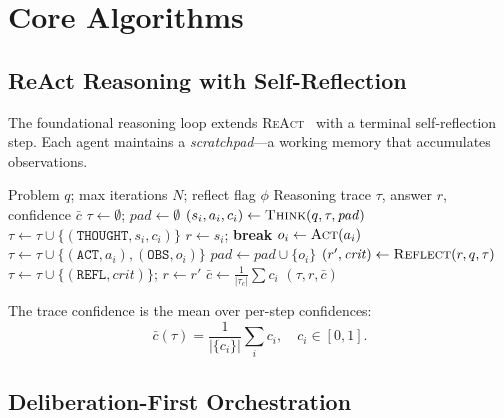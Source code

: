 \documentclass{article}
\theoremstyle{plain}
\theoremstyle{definition}
\newcommand{\react}{\textsc{ReAct}}
\begin{document}
\section{Core Algorithms}\label{sec:algorithms}

\subsection{ReAct Reasoning with Self-Reflection}\label{sec:react_algo}

The foundational reasoning loop extends \react{}~\citep{yao2023react} with a
terminal self-reflection step.  Each agent maintains a
\emph{scratchpad}---a working memory that accumulates observations.

\begin{algorithm}[ht!]
\caption{ReAct Reasoning with Self-Reflection}
\label{alg:react}
\begin{algorithmic}
\REQUIRE Problem $q$; max iterations $N$; reflect flag $\phi$
\ENSURE Reasoning trace $\tau$, answer $r$, confidence $\bar{c}$
\STATE $\tau \leftarrow \emptyset$; $\mathit{pad} \leftarrow \emptyset$
  \STATE $(s_i, a_i, c_i) \leftarrow \textsc{Think}(q, \tau, \mathit{pad})$
  \STATE $\tau \leftarrow \tau \cup \{(\texttt{THOUGHT}, s_i, c_i)\}$
    \STATE $r \leftarrow s_i$; \textbf{break}
  \ENDIF
  \STATE $o_i \leftarrow \textsc{Act}(a_i)$ 
  \STATE $\tau \leftarrow \tau \cup \{(\texttt{ACT}, a_i), (\texttt{OBS}, o_i)\}$
  \STATE $\mathit{pad} \leftarrow \mathit{pad} \cup \{o_i\}$
\ENDFOR
{}
  \STATE $(r', \mathit{crit}) \leftarrow \textsc{Reflect}(r, q, \tau)$
  \STATE $\tau \leftarrow \tau \cup \{(\texttt{REFL}, \mathit{crit})\}$; $r \leftarrow r'$
\ENDIF
\STATE $\bar{c} \leftarrow \frac{1}{|\tau_c|}\sum c_i$
\RETURN $(\tau, r, \bar{c})$
\end{algorithmic}
\end{algorithm}

The trace confidence is the mean over per-step confidences:
\begin{equation}\label{eq:trace_confidence}
  \bar{c}(\tau) = \frac{1}{|\{c_i\}|} \sum_{i} c_i, \quad c_i \in [0, 1].
\end{equation}

\subsection{Deliberation-First Orchestration}\label{sec:deliberation}
\end{document}
